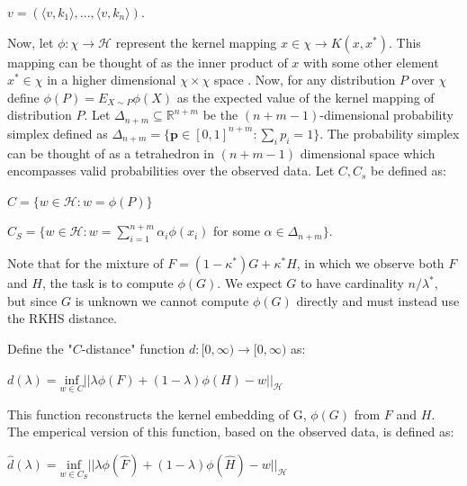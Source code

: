 \documentclass[lineno]{biometrika}
\begin{document}
\begin{center}
$v = (\langle v,k_1\rangle, ... ,\langle v,k_n\rangle)$. 
\end{center}  

Now, let $\phi : \chi \to \mathcal{H}$ represent the kernel mapping $x \in \chi \to K(x,x^*)$. This mapping can be thought of as the inner product of $x$ with some other element $x^* \in \chi$ in a higher dimensional $\chi \times \chi$ space \citep{Wahba:2002}. Now, for any distribution $P$ over $\chi$ define $\phi(P) = E_{X\sim P}\phi(X)$ as the expected value of the kernel mapping of distribution $P$. Let $\Delta_{n+m} \subseteq \mathbb{R}^{n+m}$ be the $(n+m-1)$-dimensional probability simplex defined as $ \Delta_{n+m} = \{\mathbf{p} \in [0,1]^{n+m} : \sum_i p_i = 1\}$. The probability simplex can be thought of as a tetrahedron in $(n+m-1)$ dimensional space which encompasses valid probabilities over the observed data. Let $C, C_s$ be defined as:

\begin{center}
$C = \{w \in \mathcal{H} : w = \phi (P)\}$ 
\end{center}
\begin{center}
$C_S = \{w \in \mathcal{H}: w = \sum\limits_{i=1}^{n+m} \alpha_i \phi (x_i) $ for some $\alpha \in \Delta_{n+m}\}$.
\end{center}

Note that for the mixture of $F = (1-\kappa^* )G + \kappa^* H$, in which we observe both $F$ and $H$, the task is to compute $\phi(G)$. We expect $G$ to have cardinality $n/\lambda^*$, but since $G$ is unknown we cannot compute $\phi(G)$ directly and must instead use the RKHS distance.

Define the "$C$-distance" function $d: [0,\infty) \to [0,\infty)$ as:

\begin{center}
$d(\lambda) = \underset{w\in C}{\textrm{inf}} || \lambda \phi(F) + (1-\lambda)\phi(H) - w ||_{\mathcal{H}}$
\end{center}

This function reconstructs the kernel embedding of G, $\phi (G)$ from $F$ and $H$. The emperical version of this function, based on the observed data, is defined as:

\begin{center}
$\hat{d}(\lambda) = \underset{w\in C_S}{\textrm{inf}} || \lambda \phi(\hat{F}) + (1-\lambda)\phi(\hat{H}) - w ||_{\mathcal{H}}$
\end{center}
\end{document}
